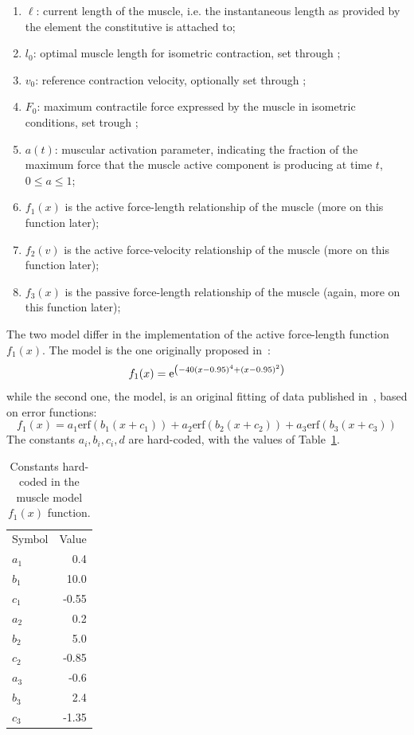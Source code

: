 \begin{enumerate}
  \item $\ell$: current length of the muscle, i.e. the instantaneous length
    as provided by the  element the constitutive is attached to;
  \item $l_0$: optimal muscle length for isometric contraction, set through
    ;
  \item $v_0$: reference contraction velocity, optionally set through ;
  \item $F_0$: maximum contractile force expressed by the muscle in isometric 
    conditions, set trough ;
  \item $a(t)$: muscular activation parameter, indicating the fraction of the 
    maximum force that the muscle active component is producing at time $t$, 
    $0 \leq a \leq 1$;
  \item $f_1(x)$ is the active force-length relationship of the muscle (more
    on this function later);
  \item $f_2(v)$ is the active force-velocity relationship of the muscle (more
    on this function later);
  \item $f_3(x)$ is the passive force-length relationship of the muscle (again,
    more on this function later);
\end{enumerate}
The two model differ in the implementation of the active force-length function $f_1(x)$. The
 model is the one originally proposed in~\cite{PENNESTRI-2007-JB}:
\begin{equation}
  f_1(x) = \mathrm{e}^{\left(-40(x - 0.95)^4 + (x - 0.95)^2\right)} \\
\end{equation}
while the second one, the  model, is an original fitting of data published 
in~\cite{WINTERS-2011-JB}, based on error functions:
\begin{equation}
  f_1(x) = a_1\mathrm{erf}(b_1(x + c_1)) + a_2\mathrm{erf}(b_2(x + c_2)) + a_3\mathrm{erf}(b_3(x + c_3))
\end{equation}
The constants $a_i, b_i, c_i, d$ are hard-coded, with the values of Table~\ref{tab:muscle_erf}.
\begin{table}
  \centering
  \begin{tabular}{lr}
    Symbol &Value \\
    $a_1$ &0.4    \\
    $b_1$ &10.0   \\
    $c_1$ &-0.55  \\
    $a_2$ &0.2    \\
    $b_2$ &5.0    \\
    $c_2$ &-0.85  \\
    $a_3$ &-0.6   \\
    $b_3$ &2.4    \\
    $c_3$ &-1.35  \\
  \end{tabular}
  \caption{Constants hard-coded in the  muscle model $f_1(x)$ function.}
  \label{tab:muscle_erf}
\end{table}

